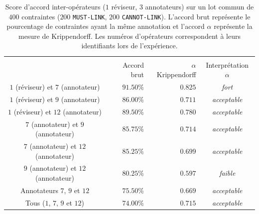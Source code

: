 			\begin{table}[!htb]
				\begin{center}
				\begin{tabular}{|c|r|r|c|}
				
					\hline
					\rowcolor{colorTableHeader!15}
						& \multicolumn{3}{c|}{
							\shortstack{Accord inter-annotateurs}
						}
						\tabularnewline
						\hhline{|~|---|}
					\rowcolor{colorTableHeader!15}
					\multirow{-2}{*}{Opérateurs} %
						& Accord brut
						& $\alpha$ Krippendorff
						& Interprétation $\alpha$
						\tabularnewline
						\hline \hline
					$1$ (réviseur) et $7$ (annotateur)
						& $91.50$\%
						& $0.825$
						& \textit{fort}
						\tabularnewline
						\hline
					$1$ (réviseur) et $9$ (annotateur)
						& $86.00$\%
						& $0.711$
						& \textit{acceptable}
						\tabularnewline
						\hline
					$1$ (réviseur) et $12$ (annotateur)
						& $89.50$\%
						& $0.780$
						& \textit{acceptable}
						\tabularnewline
						\hline
					$7$ (annotateur) et $9$ (annotateur)
						& $85.75$\%
						& $0.714$
						& \textit{acceptable}
						\tabularnewline
						\hline
					$7$ (annotateur) et $12$ (annotateur)
						& $85.25$\%
						& $0.699$
						& \textit{acceptable}
						\tabularnewline
						\hline
					$9$ (annotateur) et $12$ (annotateur)
						& $80.25$\%
						& $0.597$
						& \textit{faible}
						\tabularnewline
						\hline
					Annotateurs $7$, $9$ et $12$
						& $75.50$\%
						& $0.669$
						& \textit{acceptable}
						\tabularnewline
						\hline
					Tous ($1$, $7$, $9$ et $12$)
						& $74.00$\%
						& $0.715$
						& \textit{acceptable}
						\tabularnewline
						\hline
				\end{tabular}
				\end{center}
				\caption{
					Score d'accord inter-opérateurs ($1$ réviseur, $3$ annotateurs) sur un lot commun de $400$ contraintes ($200$ \texttt{MUST-LINK}, $200$ \texttt{CANNOT-LINK}).
					L'accord brut représente le pourcentage de contraintes ayant la même annotation et l'accord $\alpha$ représente la mesure de Krippendorff.
					Les numéros d'opérateurs correspondent à leurs identifiants lors de l'expérience.
				}
				\label{table:4.6.1-ETUDE-ROBUSTESSE-SCORE-ACCORD-INTER-ANNOTATEURS}
			\end{table}
	
